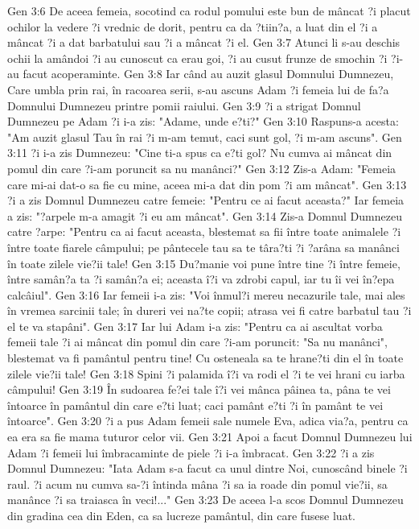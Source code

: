 Gen 3:6  De aceea femeia, socotind ca rodul pomului este bun de mâncat ?i placut ochilor la vedere ?i vrednic de dorit, pentru ca da ?tiin?a, a luat din el ?i a mâncat ?i a dat barbatului sau ?i a mâncat ?i el.
Gen 3:7  Atunci li s-au deschis ochii la amândoi ?i au cunoscut ca erau goi, ?i au cusut frunze de smochin ?i ?i-au facut acoperaminte.
Gen 3:8  Iar când au auzit glasul Domnului Dumnezeu, Care umbla prin rai, în racoarea serii, s-au ascuns Adam ?i femeia lui de fa?a Domnului Dumnezeu printre pomii raiului.
Gen 3:9  ?i a strigat Domnul Dumnezeu pe Adam ?i i-a zis: "Adame, unde e?ti?"
Gen 3:10  Raspuns-a acesta: "Am auzit glasul Tau în rai ?i m-am temut, caci sunt gol, ?i m-am ascuns".
Gen 3:11  ?i i-a zis Dumnezeu: "Cine ti-a spus ca e?ti gol? Nu cumva ai mâncat din pomul din care ?i-am poruncit sa nu manânci?"
Gen 3:12  Zis-a Adam: "Femeia care mi-ai dat-o sa fie cu mine, aceea mi-a dat din pom ?i am mâncat".
Gen 3:13  ?i a zis Domnul Dumnezeu catre femeie: "Pentru ce ai facut aceasta?" Iar femeia a zis: "?arpele m-a amagit ?i eu am mâncat".
Gen 3:14  Zis-a Domnul Dumnezeu catre ?arpe: "Pentru ca ai facut aceasta, blestemat sa fii între toate animalele ?i între toate fiarele câmpului; pe pântecele tau sa te târa?ti ?i ?arâna sa manânci în toate zilele vie?ii tale!
Gen 3:15  Du?manie voi pune între tine ?i între femeie, între samân?a ta ?i samân?a ei; aceasta î?i va zdrobi capul, iar tu îi vei în?epa calcâiul".
Gen 3:16  Iar femeii i-a zis: "Voi înmul?i mereu necazurile tale, mai ales în vremea sarcinii tale; în dureri vei na?te copii; atrasa vei fi catre barbatul tau ?i el te va stapâni".
Gen 3:17  Iar lui Adam i-a zis: "Pentru ca ai ascultat vorba femeii tale ?i ai mâncat din pomul din care ?i-am poruncit: "Sa nu manânci", blestemat va fi pamântul pentru tine! Cu osteneala sa te hrane?ti din el în toate zilele vie?ii tale!
Gen 3:18  Spini ?i palamida î?i va rodi el ?i te vei hrani cu iarba câmpului!
Gen 3:19  În sudoarea fe?ei tale î?i vei mânca pâinea ta, pâna te vei întoarce în pamântul din care e?ti luat; caci pamânt e?ti ?i în pamânt te vei întoarce".
Gen 3:20  ?i a pus Adam femeii sale numele Eva, adica via?a, pentru ca ea era sa fie mama tuturor celor vii.
Gen 3:21  Apoi a facut Domnul Dumnezeu lui Adam ?i femeii lui îmbracaminte de piele ?i i-a îmbracat.
Gen 3:22  ?i a zis Domnul Dumnezeu: "Iata Adam s-a facut ca unul dintre Noi, cunoscând binele ?i raul. ?i acum nu cumva sa-?i întinda mâna ?i sa ia roade din pomul vie?ii, sa manânce ?i sa traiasca în veci!..."
Gen 3:23  De aceea l-a scos Domnul Dumnezeu din gradina cea din Eden, ca sa lucreze pamântul, din care fusese luat.
